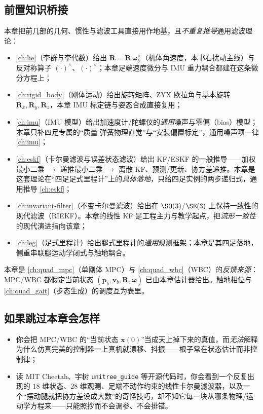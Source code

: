 \subsection*{前置知识桥接}
本章把前几部的几何、惯性与滤波工具直接用作地基，且\emph{不重复推导}通用滤波理论：
\begin{itemize}
  \item \cref{ch:lie}（李群与李代数）给出 $\dot{\mathbf{R}}=\mathbf{R}\,\boldsymbol{\omega}_b^{\wedge}$（机体角速度，本书右扰动主线）与反对称算子 $(\cdot)^\wedge$、$(\cdot)^\vee$；本章足端速度微分与 IMU 重力耦合都建在这条微分方程上；
  \item \cref{ch:rigid_body}（刚体运动）给出旋转矩阵、ZYX 欧拉角与基本旋转 $\mathbf{R}_x,\mathbf{R}_y,\mathbf{R}_z$，本章 IMU 标定链与姿态合成直接复用；
  \item \cref{ch:imu}（IMU 模型）给出加速度计/陀螺仪的\emph{通用}噪声与零偏（bias）模型；本章只补四足专属的“质量-弹簧物理直觉”与“安装偏置标定”，通用噪声项一律 \cref{ch:imu}；
  \item \cref{ch:eskf}（卡尔曼滤波与误差状态滤波）给出 KF/ESKF 的一般推导——加权最小二乘 $\to$ 递推最小二乘 $\to$ 离散 KF、预测/更新、协方差递推。本章是这套理论在“四足足式里程计”上的\emph{具体落地}，只给四足实例的两步递归式，通用推导 \cref{ch:eskf}；
  \item \cref{ch:invariant-filter}（不变卡尔曼滤波）给出在 $\SO(3)$/$\SE(3)$ 上保持一致性的现代滤波（RIEKF）。本章的线性 KF 是工程主力与教学起点，把\emph{流形一致性}的现代演进指向该章；
  \item \cref{ch:leg}（足式里程计）给出腿式里程计的\emph{通用}观测框架；本章是其四足落地，侧重串联腿运动学闭式与触地耦合。
\end{itemize}
本章是 \cref{ch:quad_mpc}（单刚体 MPC）与 \cref{ch:quad_wbc}（WBC）的\emph{反馈来源}：MPC/WBC 都假定当前状态 $(\boldsymbol{p}_b,\boldsymbol{v}_b,\mathbf{R},\boldsymbol{\omega})$ 已由本章估计器给出。触地相位与 \cref{ch:quad_gait}（步态生成）的调度互为表里。

\subsection*{如果跳过本章会怎样}
\begin{itemize}
  \item 你会把 MPC/WBC 的“当前状态 $\boldsymbol{x}(0)$”当成天上掉下来的真值，而\emph{无法}解释为什么仿真完美的控制器一上真机就漂移、抖振——根子常在状态估计而非控制律；
  \item 读 MIT Cheetah、宇树 \texttt{unitree\_guide} 等开源代码时，你会看到一个反复出现的 $18$ 维状态、$28$ 维观测、足端不动作约束的线性卡尔曼滤波器，以及一个“摆动腿就把协方差设成大数”的奇怪技巧，却不知它每一块从哪条物理/运动学方程来——只能照抄而不会调参、不会排错。
\end{itemize}

